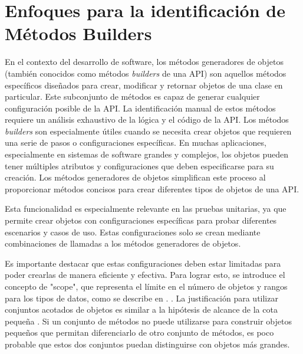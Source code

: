 \chapter[Identificación de métodos builders]{Enfoques para la identificación de Métodos Builders}
\label{cap:builders}

% 



En el contexto del desarrollo de software, los métodos generadores de objetos (también conocidos como métodos \emph{builders} de una API) son aquellos métodos específicos diseñados para crear, modificar y retornar objetos de una clase en particular. Este subconjunto de métodos es capaz de generar cualquier configuración posible de la API. La identificación manual de estos métodos requiere un análisis exhaustivo de la lógica y el código de la API.
Los métodos \emph{builders} son especialmente útiles cuando se necesita crear objetos que requieren una serie de pasos o configuraciones específicas. En muchas aplicaciones, especialmente en sistemas de software grandes y complejos, los objetos pueden tener múltiples atributos y configuraciones que deben especificarse para su creación. Los métodos generadores de objetos simplifican este proceso al proporcionar métodos concisos para crear diferentes tipos de objetos de una API.

Esta funcionalidad es especialmente relevante en las pruebas unitarias, ya que permite crear objetos con configuraciones específicas para probar diferentes escenarios y casos de uso. Estas configuraciones solo se crean mediante combinaciones de llamadas a los métodos generadores de objetos.

Es importante destacar que estas configuraciones deben estar limitadas para poder crearlas de manera eficiente y efectiva. Para lograr esto, se introduce el concepto de "scope", que representa el límite en el número de objetos y rangos para los tipos de datos, como se describe en \cite{jackson2006, frias2005dynalloy}.
. La justificación para utilizar conjuntos acotados de objetos es similar a la hipótesis de alcance de la cota pequeña \cite{Andoni:2003}. Si un conjunto de métodos no puede utilizarse para construir objetos pequeños que permitan diferenciarlo de otro conjunto de métodos, es poco probable que estos dos conjuntos puedan distinguirse con objetos más grandes.

